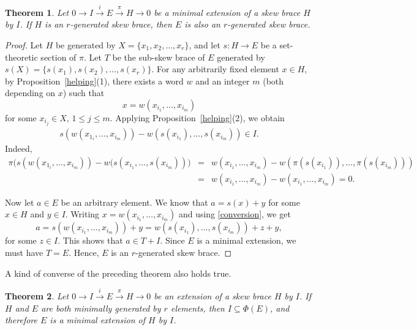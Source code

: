 \documentclass[11pt]{amsart}
\theoremstyle{thrm}
\theoremstyle{plain}
\newtheorem{thm}{Theorem}[section]
\theoremstyle{definition}
\numberwithin{equation}{section}
\begin{document}
\begin{thm}
Let $0 \longrightarrow I \xrightarrow{i} E \xrightarrow{\pi} H \longrightarrow 0$ be a minimal extension of a skew brace $H$ by $I$.  If $H$ is an $r$-generated skew brace, then $E$ is also an $r$-generated skew brace.
\end{thm}

\begin{proof}
Let $H$ be generated by $X=\{x_1,x_2, \ldots, x_r\}$, and let  $s \colon H \to E$ be a set-theoretic section of $\pi$.  
Let $T$ be the sub-skew brace of $E$ generated by  $s(X)= \{s(x_1), s(x_2), \ldots, s(x_r)\}$.  
For any arbitrarily fixed element $x \in H$, by Proposition~\ref{helping}(1), there exists a word $w$  and an integer $m$ (both depending on $x$) such that 
\[
x = w(x_{i_1},\ldots,x_{i_m}) 
\]
for some $x_{i_j} \in X$, $1 \leq j \leq m$.  
Applying Proposition~\ref{helping}(2), we obtain
\begin{align}\label{conversion}
s(w(x_{1_i}, \ldots, x_{i_m})) - w(s(x_{i_1}),\ldots,s(x_{i_m})) \in I.
\end{align}
Indeed,
\begin{eqnarray*}
\pi\bigl(s(w(x_{1_i}, \ldots, x_{i_m})) - w(s(x_{i_1},\ldots,s(x_{i_m}))\bigr)
&=&   w(x_{i_1},\ldots,x_{i_m}) - w(\pi(s(x_{i_1})), \ldots, \pi(s(x_{i_m})))\\
&=&  w(x_{i_1},\ldots,x_{i_m}) - w(x_{i_1},\ldots,x_{i_m}) = 0 .
\end{eqnarray*}

Now let $a \in E$ be an arbitrary element.   We know that $a = s(x) + y$ for some $x \in H$ and $y \in I$.  
Writing $x = w(x_{i_1},\ldots,x_{i_m}) $ and using \eqref{conversion}, we get
\[
a = s(w(x_{i_1},\ldots,x_{i_m}) ) + y 
= w(s(x_{i_1}), \ldots,s(x_{i_m})) + z + y,
\]
for some $z \in I$.  
This shows that $a \in T+I$.  
Since $E$ is a minimal extension, we must have $T = E$.  
Hence, $E$ is an $r$-generated skew brace.
\end{proof}


A kind of converse of the preceding theorem also holds true.

\begin{thm}\label{confrat}
Let $0 \longrightarrow I \xrightarrow{i} E \xrightarrow{\pi} H \longrightarrow 0$ be an extension of a skew brace $H$ by $I$.   If $H$ and $E$ are  both  minimally generated by $r$ elements, then  $I \subseteq \Phi(E)$, and therefore  $E$ is a minimal extension of $H$ by $I$.
\end{thm}
\end{document}
